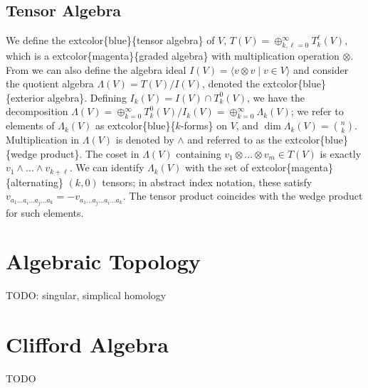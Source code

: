\documentclass[
]{book}
\begin{document}
\hypertarget{tensor-algebra}{%
\section{Tensor Algebra}\label{tensor-algebra}}

We define the extcolor\{blue\}\{tensor algebra\} of \(V\), \(T(V) = \oplus_{k,\ell = 0}^\infty T_k^\ell(V)\), which is a extcolor\{magenta\}\{graded algebra\} with multiplication operation \(\otimes\). From we can also define the algebra ideal \(I(V) = \langle v \otimes v \; | \; v \in V\rangle\) and consider the quotient algebra \(\Lambda(V) = T(V) / I(V)\), denoted the extcolor\{blue\}\{exterior algebra\}. Defining \(I_k(V) = I(V) \cap T_k^0(V)\), we have the decomposition \(\Lambda(V) = \oplus_{k=0}^\infty T_k^0(V)/I_k(V) = \oplus_{k=0}^\infty \Lambda_k(V)\); we refer to elements of \(\Lambda_k(V)\) as extcolor\{blue\}\{\(k\)-forms\} on \(V\), and \(\dim \Lambda_k(V) = \binom{n}{k}\). Multiplication in \(\Lambda(V)\) is denoted by \(\wedge\) and referred to as the extcolor\{blue\}\{wedge product\}. The coset in \(\Lambda(V)\) containing \(v_1 \otimes \dots \otimes v_{m} \in T(V)\) is exactly \(v_1 \wedge \dots \wedge v_{k+\ell}\). We can identify \(\Lambda_k(V)\) with the set of extcolor\{magenta\}\{alternating\} \((k,0)\) tensors; in abstract index notation, these satisfy \(v_{a_1\dots a_i \dots a_j \dots a_k} = -v_{a_1\dots a_j \dots a_i \dots a_k}\). The tensor product coincides with the wedge product for such elements.

\hypertarget{algebraic-topology}{%
\chapter{Algebraic Topology}\label{algebraic-topology}}

TODO: singular, simplical homology

\hypertarget{clifford-algebra}{%
\chapter{Clifford Algebra}\label{clifford-algebra}}

TODO

  
\end{document}
